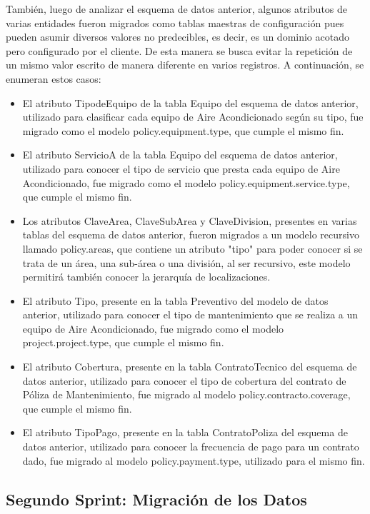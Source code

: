\documentclass[a4paper, 12pt]{article}
\begin{document}
También, luego de analizar el esquema de datos anterior, algunos atributos de varias entidades fueron migrados como tablas maestras de configuración pues pueden asumir diversos valores no predecibles, es decir, es un dominio acotado pero configurado por el cliente. De esta manera se busca evitar la repetición de un mismo valor escrito de manera diferente en varios registros. A continuación, se enumeran estos casos:

\begin{itemize}
    \item El atributo TipodeEquipo de la tabla Equipo del esquema de datos anterior, utilizado para clasificar cada equipo de Aire Acondicionado según su tipo, fue migrado como el modelo policy.equipment.type, que cumple el mismo fin.
    \item El atributo ServicioA de la tabla Equipo del esquema de datos anterior, utilizado para conocer el tipo de servicio que presta cada equipo de Aire Acondicionado, fue migrado como el modelo policy.equipment.service.type, que cumple el mismo fin.
    \item Los atributos ClaveArea, ClaveSubArea y ClaveDivision, presentes en varias tablas del esquema de datos anterior, fueron migrados a un modelo recursivo llamado policy.areas, que contiene un atributo "tipo" para poder conocer si se trata de un área, una sub-área o una división, al ser recursivo, este modelo permitirá también conocer la jerarquía de localizaciones.
    \item El atributo Tipo, presente en la tabla Preventivo del modelo de datos anterior, utilizado para conocer el tipo de mantenimiento que se realiza a un equipo de Aire Acondicionado, fue migrado como el modelo project.project.type, que cumple el mismo fin.
    \item El atributo Cobertura, presente en la tabla ContratoTecnico del esquema de datos anterior, utilizado para conocer el tipo de cobertura del contrato de Póliza de Mantenimiento, fue migrado al modelo policy.contracto.coverage, que cumple el mismo fin.
    \item El atributo TipoPago, presente en la tabla ContratoPoliza del esquema de datos anterior, utilizado para conocer la frecuencia de pago para un contrato dado, fue migrado al modelo policy.payment.type, utilizado para el mismo fin.
\end{itemize}

\subsection{Segundo Sprint: Migración de los Datos}
\end{document}
